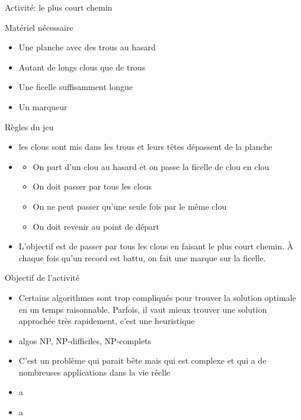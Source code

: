 \documentclass[final,hyperref={pdfpagelabels=false}]{beamer}
\renewcommand*{\normalsize}{\fontsize{\resultnormalsizeX}{\resultnormalsizeY}\selectfont}
\begin{document}
\begin{frame}{Activité: le plus court chemin}
  


  \begin{block}{Matériel nécessaire}
    \begin{itemize}
    \item Une planche avec des trous au hasard
    \item Autant de longs clous que de trous
    \item Une ficelle suffisamment longue
    \item Un marqueur
    \end{itemize}
  \end{block}

  \begin{block}{Règles du jeu}
    \begin{itemize}
    \item {} les clous sont mis dans les trous et leurs têtes dépassent de la planche
    \item {}
      \begin{itemize}\normalsize
      \item On part d'un clou au hasard et on passe la ficelle de clou en clou
      \item On doit passer par tous les clous
      \item On ne peut passer qu'une seule fois par le même clou
      \item On doit revenir au point de départ
      \end{itemize}
    \item  {} L'objectif est de passer par tous les
    clous en faisant le plus court chemin. À chaque fois qu'un record est
    battu, on fait une marque sur la ficelle.
    \end{itemize}
  \end{block}

  \bigskip
  \begin{block}{Objectif de l'activité}
    \begin{itemize}
    \item Certains algorithmes sont trop compliqués pour trouver la
    \alert{solution optimale} en un temps \alert{raisonnable}. Parfois, il
    vaut mieux trouver une solution approchée très rapidement, c'est une \alert{heuristique}
    \item algos NP, NP-difficiles, NP-complets
    \item C'est un problème qui parait bête mais qui est complexe et qui a de nombreuses applications dans la vie réelle
    \item a
    \item a
    \end{itemize}
  \end{block}

\end{frame}
\end{document}
